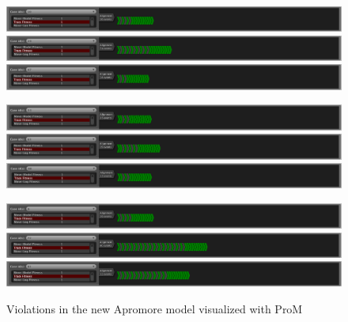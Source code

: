 \begin{figure}[H]
\centering
\includegraphics[width=\textwidth]{figures/violation_case/10-apromore-new.png}
\includegraphics[width=\textwidth]{figures/violation_case/20-apromore-new.png}
\includegraphics[width=\textwidth]{figures/violation_case/47-apromore-new.png}

\includegraphics[width=\textwidth]{figures/violation_case/53-apromore-new.png}
\includegraphics[width=\textwidth]{figures/violation_case/63-apromore-new.png}
\includegraphics[width=\textwidth]{figures/violation_case/88-apromore-new.png}

\includegraphics[width=\textwidth]{figures/violation_case/6-apromore-new.png}
\includegraphics[width=\textwidth]{figures/violation_case/72-apromore-new.png}
\includegraphics[width=\textwidth]{figures/violation_case/81-apromore-new.png}
\caption{Violations in the new Apromore model visualized with ProM}
\label{fig:violations_apromore_new}
\end{figure}